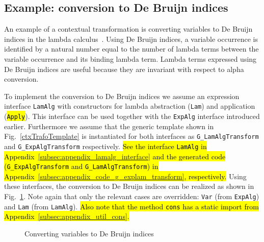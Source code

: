 \subsection{Example: conversion to De Bruijn indices}\label{subsec:debruign_example}

An example of a contextual transformation is converting variables to De Bruijn indices in the lambda calculus~\cite{deBruijn1972381}.
Using De Bruijn indices, a variable occurrence is identified by a natural number equal to the number of lambda terms between the variable occurrence and its binding lambda term.
Lambda terms expressed using De Bruijn indices are useful because they are invariant with respect to alpha conversion.

To implement the conversion to De Bruijn indices we assume an expression interface \lstinline{LamAlg} with constructors for lambda abstraction (\lstinline{Lam}) and application (\hl{\lstinline{Apply}}).
This interface can be used together with the \lstinline{ExpAlg} interface introduced earlier.
Furthermore we assume that the generic template shown in Fig.~\ref{ctxTrafoTemplate} is instantiated for both interfaces as \lstinline{G_LamAlgTransform} and \lstinline{G_ExpAlgTransform} respectively. \hl{See the interface \lstinline{LamAlg} in Appendix~\ref{subsec:appendix_lamalg_interface} and the generated code (\lstinline{G_ExpAlgTransform} and \lstinline{G_LamAlgTransform}) in Appendix~\ref{subsec:appendix_code_g_explam_transform}, respectively.}
Using these interfaces, the conversion to De Bruijn indices can be realized as shown in Fig.~\ref{DeBruijn}.
Note again that only the relevant cases are overridden: \lstinline{Var} (from \lstinline{ExpAlg}) and \lstinline{Lam} (from \lstinline{LamAlg}).
\hl{Also note that the method \lstinline{cons} has a static import from Appendix~\ref{subsec:appendix_util_cons}.}


\begin{figure}[t]
\nocaptionrule
\caption{Converting variables to De Bruijn indices}
\label{DeBruijn}
\end{figure}





